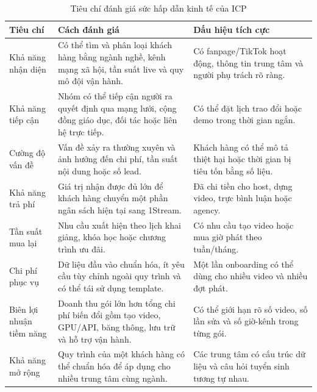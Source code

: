 \begin{table}[H]
    \centering
    \small
    \setlength{\tabcolsep}{4pt}
    \renewcommand{\arraystretch}{1.25}
    \caption{Tiêu chí đánh giá sức hấp dẫn kinh tế của ICP}
    \label{tab:economic-attractiveness-icp}
    \begin{tabularx}{\linewidth}{@{}L{2.8cm}Y Y@{}}
        \toprule
        \textbf{Tiêu chí} & \textbf{Cách đánh giá} & \textbf{Dấu hiệu tích cực} \\ \midrule
        Khả năng nhận diện & Có thể tìm và phân loại khách hàng bằng ngành nghề,
        kênh mạng xã hội, tần suất live và quy mô đội vận hành. &
        Có fanpage/TikTok hoạt động, thông tin trung tâm và người phụ trách rõ ràng. \\
        Khả năng tiếp cận & Nhóm có thể tiếp cận người ra quyết định qua mạng
        lưới, cộng đồng giáo dục, đối tác hoặc liên hệ trực tiếp. &
        Có thể đặt lịch trao đổi hoặc demo trong thời gian ngắn. \\
        Cường độ vấn đề & Vấn đề xảy ra thường xuyên và ảnh hưởng đến chi phí,
        tần suất nội dung hoặc số lead. &
        Khách hàng có thể mô tả thiệt hại hoặc thời gian bị tiêu tốn bằng số liệu. \\
        Khả năng trả phí & Giá trị nhận được đủ lớn để khách hàng chuyển một phần
        ngân sách hiện tại sang 1Stream. &
        Đã chi tiền cho host, dựng video, trực bình luận hoặc agency. \\
        Tần suất mua lại & Nhu cầu xuất hiện theo lịch khai giảng, khóa học hoặc
        chương trình ưu đãi. &
        Có nhu cầu tạo video hoặc mua giờ phát theo tuần/tháng. \\
        Chi phí phục vụ & Dữ liệu đầu vào chuẩn hóa, ít yêu cầu tùy chỉnh ngoài
        quy trình và có thể tái sử dụng template. &
        Một lần onboarding có thể dùng cho nhiều video và nhiều đợt phát. \\
        Biên lợi nhuận tiềm năng & Doanh thu gói lớn hơn tổng chi phí biến đổi
        gồm tạo video, GPU/API, băng thông, lưu trữ và hỗ trợ vận hành. &
        Có thể giới hạn rõ số video, số lần sửa và số giờ-kênh trong từng gói. \\
        Khả năng mở rộng & Quy trình của một khách hàng có thể chuẩn hóa để áp
        dụng cho nhiều trung tâm cùng ngành. &
        Các trung tâm có cấu trúc dữ liệu và câu hỏi tuyển sinh tương tự nhau. \\ \bottomrule
    \end{tabularx}
\end{table}

